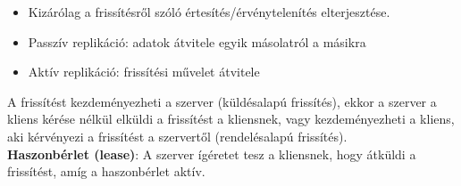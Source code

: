 \documentclass[margin=0px]{article}
\begin{document}
\begin{itemize}
    \item	Kizárólag  a frissítésről szóló értesítés/érvénytelenítés elterjesztése.
    \item	Passzív replikáció: adatok átvitele egyik másolatról a másikra
    \item	Aktív replikáció: frissítési művelet átvitele
\end{itemize}

A frissítést kezdeményezheti a szerver (küldésalapú frissítés), ekkor a szerver a kliens kérése nélkül elküldi a frissítést
a kliensnek, vagy kezdeményezheti a kliens, aki kérvényezi a frissítést a szervertől (rendelésalapú frissítés).\\

\noindent \textbf{Haszonbérlet (lease)}: A szerver ígéretet tesz a kliensnek, hogy átküldi a frissítést, amíg a haszonbérlet aktív.
\end{document}
